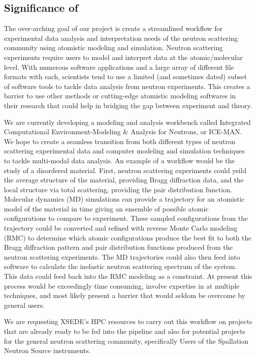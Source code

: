 \subsection*{Significance of  }

The over-arching goal of our project is create a streamlined workflow
for experimental data analysis and interpretation
needs of the neutron scattering community using atomistic modeling and
simulation. Neutron scattering experiments require users to model and
interpret data at the atomic/molecular level. With numerous software
applications and a large array of different file formats with each,
scientists tend to use a limited (and sometimes dated) subset of
software tools to tackle data analysis from neutron experiments. This
creates a barrier to use other methods or cutting-edge atomistic
modeling softwares in their research that could help in bridging the gap
between experiment and theory.

We are currently developing a modeling and analysis workbench called
Integrated Computational Environment-Modeling \& Analysis for Neutrons,
or ICE-MAN. We hope to create a seamless transition from both different
types of neutron scattering experimental data and computer modeling and
simulation techniques to tackle multi-modal data
analysis. An example of a workflow would be the study of a disordered
material. First, neutron scattering experiments could yeild the average
structure of the material, providing Bragg diffraction data, and
the local structure via total scattering, providing the pair
distribution function.  Molecular dynamics (MD) simulations can provide
a trajectory for an atomistic model of the material in time giving an
ensemble of possible atomic configurations to compare to experiment.
These sampled
configurations from the trajectory could be converted and refined with
reverse Monte Carlo modeling (RMC) to determine which atomic configurations
produce the best fit to both the Bragg diffraction pattern and pair
distribution functions produced from the neutron scattering experiments.
The MD trajectories could also then feed into software to calculate the
inelastic neutron scattering spectrum of the system. This data could
feed back into the RMC modeling as a constraint. At present this process
would be exceedingly time consuming, involve expertise in at multiple
techniques, and most likely present a barrier that would
seldom be overcome by general users.

We are requesting XSEDE's HPC resources to carry out this workflow on projects that are already ready to be fed into the pipeline and also for potential projects for the general neutron scattering community, specifically Users of the Spallation Neutron Source instruments.
